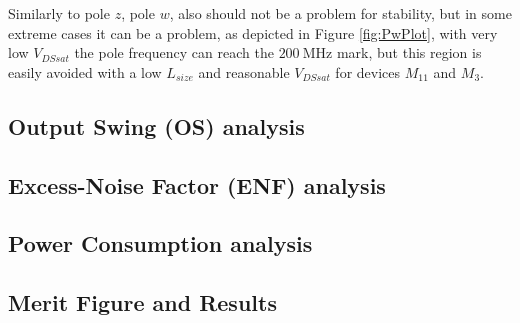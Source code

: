 Similarly to pole $z$, pole $w$, also should not be a problem for stability, but in some extreme cases it can be a problem, as depicted in Figure \ref{fig:PwPlot}, with very low $V_{DSsat}$ the pole frequency can reach the $\SI{200}{\mega\hertz}$ mark, but this region is easily avoided with a low $L_{size}$ and reasonable $V_{DSsat}$ for devices $M_{11}$ and $M_3$.

\subsection{Output Swing (OS) analysis}



\subsection{Excess-Noise Factor (ENF) analysis}

\subsection{Power Consumption analysis}

\subsection{Merit Figure and Results}
